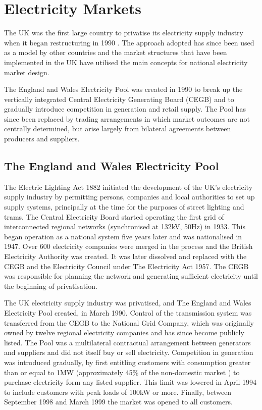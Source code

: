 \section{Electricity Markets}
The UK was the first large country to privatise its electricity supply industry
when it began restructuring in 1990 \cite{newbery:2005}.  The approach
adopted has since been used as a model by other countries and the market
structures that have been implemented in the UK have utilised the main
concepts for national electricity market design.

The England and Wales Electricity Pool was created in 1990 to break up the
vertically integrated Central Electricity Generating Board (CEGB) and to
gradually introduce competition in generation and retail supply.
The Pool has since been
replaced by trading arrangements in which market outcomes are not centrally
determined, but arise largely from bilateral agreements between producers and
suppliers.

\subsection{The England and Wales Electricity Pool}
\label{sec:thepool}
The Electric Lighting Act 1882 initiated the development of the UK's electricity
supply industry by permitting persons, companies and local authorities to set up
supply systems, principally at the time for the purposes of street lighting and
trams.  The Central Electricity Board started operating the first grid of
interconnected regional networks (synchronised at 132kV, 50Hz) in 1933. This
began operation as a national system five years later and was nationalised in
1947.  Over 600 electricity companies were merged in the process and the British
Electricity Authority was created.  It was later dissolved and replaced with the
CEGB and the Electricity Council under The Electricity Act 1957.  The CEGB was
responsible for planning the network and generating sufficient electricity until
the beginning of privatisation.

The UK electricity supply industry was privatised, and The England and Wales
Electricity Pool created, in March 1990.  Control of the transmission system was
transferred from the CEGB to the National Grid Company, which was originally
owned by twelve regional electricity companies and has since become publicly
listed.  The Pool was a multilateral contractual arrangement between generators
and suppliers and did not itself buy or sell electricity.  Competition in
generation was introduced gradually, by first entitling customers with
consumption greater than or equal to 1MW (approximately 45\% of the non-domestic
market \cite{decc:dukes09}) to purchase electricity form any listed supplier.
This limit was lowered in April 1994 to include customers with peak loads of
100kW or more.  Finally, between September 1998 and March 1999 the market was
opened to all customers.

